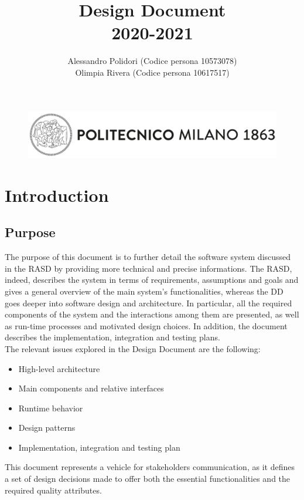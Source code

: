 \documentclass{article}
\title{ Design Document\\2020-2021}
\author{Alessandro Polidori (Codice persona 10573078)\\Olimpia Rivera (Codice persona 10617517)}
\date{}
\begin{document}
\renewcommand{\labelitemi}{\normalfont -} 

\begin{figure}[]
  \includegraphics[width=\linewidth]{logo_politecnico copia.png}
  
\end{figure}
\maketitle
\tableofcontents{}
\newpage

\section{Introduction}
\subsection{Purpose}
The purpose of this document is to further detail the software system discussed in the RASD by providing more technical and precise informations. The RASD, indeed, describes the system in terms of requirements, assumptions and goals and gives a general overview of the main system’s functionalities, whereas the DD goes deeper into software design and architecture. In particular, all the required components of the system and the interactions among them are presented, as well as run-time processes and motivated design choices. In addition, the document describes the implementation, integration and testing plans.\\
The relevant issues explored in the Design Document are the following:
\begin{itemize}
\item High-level architecture
\item Main components and relative interfaces
\item Runtime behavior
\item Design patterns
\item Implementation, integration and testing plan
\end{itemize}
This document represents a vehicle for stakeholders communication, as it defines a set of design  decisions made to offer both the essential functionalities and the required quality attributes.
\end{document}
